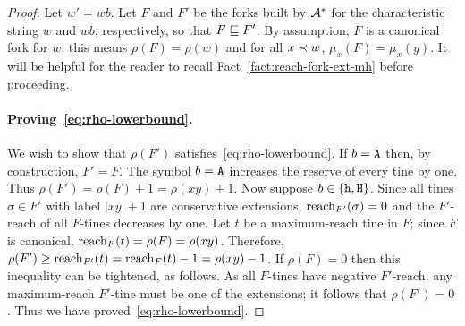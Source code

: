 \begin{proof}  
  Let $w' = wb$.
  Let $F$ and $F'$ be the forks built by $\mathcal{A}^*$ 
  for the characteristic string $w$ and $wb$, respectively, 
  so that $F \sqsubseteq F'$.
  By assumption, $F$ is a canonical fork for $w$; 
  this means $\rho(F) = \rho(w)$ and
  for all $x \prec w$, $\mu_x(F) = \mu_x(y)$. 
  It will be helpful for the reader to recall Fact~\ref{fact:reach-fork-ext-mh} before proceeding.


  \paragraph{Proving~\eqref{eq:rho-lowerbound}.} 
  We wish to show that 
  $\rho(F')$ satisfies~\eqref{eq:rho-lowerbound}. 
  If $b = \mathtt{A}$ then, by construction,
  $F' = F$. 
  The symbol $b = \mathtt{A}$ increases the reserve 
  of every tine by one. 
  Thus  
  $
  \rho(F') 
  = \rho(F) + 1
  = \rho(xy)  + 1
  $. 
  Now suppose $b \in \{\mathtt{h}, \mathtt{H}\}$. 
  Since all tines $\sigma \in F'$ with label $|xy| + 1$ 
  are conservative extensions, $\operatorname{reach}_{F'}(\sigma) = 0$ 
  and the $F'$-reach of all $F$-tines decreases by one. 
  Let $t$ be a maximum-reach tine in $F$; 
  since $F$ is canonical, $\operatorname{reach}_F(t) = \rho(F) = \rho(xy)$.
  Therefore, 
  $\rho(F') \geq \operatorname{reach}_{F'}(t) = \operatorname{reach}_{F}(t) - 1 = \rho(xy) - 1$. 
  If $\rho(F) = 0$ then this inequality can be tightened, as follows. 
  As all $F$-tines have negative $F'$-reach, 
  any maximum-reach $F'$-tine 
  must be one of the extensions; 
  it follows that $\rho(F') = 0$. 
  Thus we have proved~\eqref{eq:rho-lowerbound}. 




\end{proof}

